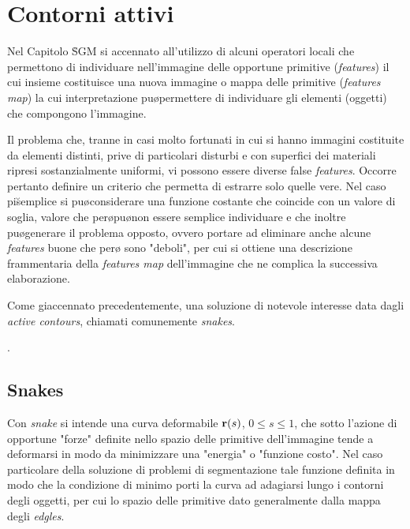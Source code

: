 \chapter{Contorni attivi}

Nel Capitolo \r{SGM} si \e accennato all'utilizzo di alcuni operatori locali che permettono di
individuare nell'immagine delle opportune primitive ({\it features}) il cui insieme costituisce una nuova
immagine o mappa delle primitive ({\it features map}) la cui interpretazione pu\o permettere di
individuare gli elementi (oggetti) che compongono l'immagine.

Il problema \e che, tranne in casi molto fortunati in cui si hanno immagini costituite da
elementi distinti, prive di particolari disturbi e con superfici dei materiali ripresi sostanzialmente uniformi,
vi possono essere diverse false {\it features}.
Occorre pertanto definire un criterio che permetta di estrarre solo quelle vere.
Nel caso pi\u semplice si pu\o considerare una funzione costante che coincide con un
valore di soglia, valore che per\o pu\o non essere semplice individuare e che inoltre pu\o generare
il problema opposto, ovvero portare ad eliminare anche alcune {\it features} buone che per\o
sono "deboli", per cui si ottiene una descrizione frammentaria della {\it features map} 
dell'immagine che ne complica la successiva elaborazione.

Come gi\a accennato precedentemente, una soluzione di notevole interesse 
\e data dagli {\it active contours}, chiamati comunemente {\it snakes}\footnotemark \cite{Kass}.

.


\section{Snakes}

Con {\it snake} si intende una curva deformabile ${\bf r}(s)$, $0 \leq s \leq 1$,
che sotto l'azione di opportune "forze" definite nello spazio delle primitive 
dell'immagine tende a deformarsi in modo da minimizzare una "energia" o
"funzione costo".
Nel caso particolare della soluzione di problemi di segmentazione tale funzione
\e definita in modo che la condizione di minimo porti la curva ad adagiarsi lungo
i contorni degli oggetti, per cui lo spazio delle primitive \e dato generalmente dalla 
mappa degli {\it edgles}.

